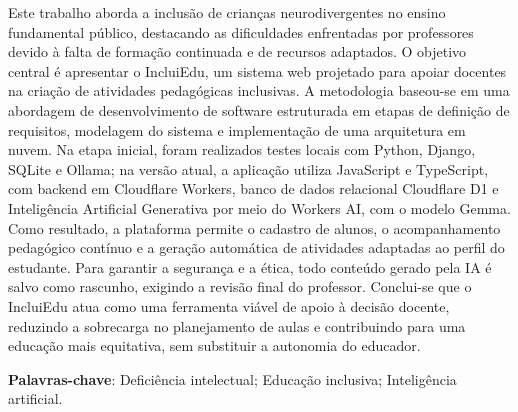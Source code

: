 %
\begin{RESUMO}
\thispagestyle{empty}

	Este trabalho aborda a inclusão de crianças neurodivergentes no ensino fundamental público, destacando as dificuldades enfrentadas por professores devido à falta de formação continuada e de recursos adaptados. O objetivo central é apresentar o IncluiEdu, um sistema web projetado para apoiar docentes na criação de atividades pedagógicas inclusivas. A metodologia baseou-se em uma abordagem de desenvolvimento de software estruturada em etapas de definição de requisitos, modelagem do sistema e implementação de uma arquitetura em nuvem. Na etapa inicial, foram realizados testes locais com Python, Django, SQLite e Ollama; na versão atual, a aplicação utiliza JavaScript e TypeScript, com backend em Cloudflare Workers, banco de dados relacional Cloudflare D1 e Inteligência Artificial Generativa por meio do Workers AI, com o modelo Gemma. Como resultado, a plataforma permite o cadastro de alunos, o acompanhamento pedagógico contínuo e a geração automática de atividades adaptadas ao perfil do estudante. Para garantir a segurança e a ética, todo conteúdo gerado pela IA é salvo como rascunho, exigindo a revisão final do professor. Conclui-se que o IncluiEdu atua como uma ferramenta viável de apoio à decisão docente, reduzindo a sobrecarga no planejamento de aulas e contribuindo para uma educação mais equitativa, sem substituir a autonomia do educador.
	
	\vspace*{0.5cm}\noindent\textbf{Palavras-chave}: Deficiência intelectual; Educação inclusiva; Inteligência artificial.
	
\end{RESUMO}

